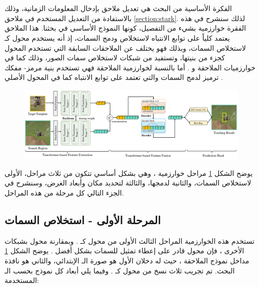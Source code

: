 \section{\label{section:swintrack}}
الفكرة الأساسية من البحث هي تعديل ملاحق
بإدخال المعلومات الزمانية، وذلك بالاستفادة من التعديل المستخدم في ملاحق 
\ref{section:stark}. 
لذلك سنشرح في هذه الفقرة خوارزمية 
بشيء من التفصيل، كونها النموذج الأساسي في بحثنا.
\newline
هذا الملاحق يعتمد كلياً على توابع الانتباه لاستخلاص ودمج السمات، إذ أنه يستخدم محول
كـ
لاستخلاص السمات، وبذلك فهو يختلف عن الملاحقات السابقة التي تستخدم المحول كجزء من بنيتها، وتستفيد من شبكات
لاستخلاص سمات الصور، وذلك كما في خوارزميات الملاحقة
و
.
أما بالنسبة لخوارزمية الملاحقة 
فهي تستخدم بنية  مرمز- مفكك ترميز
لدمج السمات والتي تعتمد على توابع الانتباه كما في المحول الأصلي
. 

\begin{figure}[!h]
	\centerline{\includegraphics[width=\textwidth]{images/swinTrack}}
	\caption{
		}
	\label{fig:swintrack}	
\end{figure}
يوضح الشكل 
\ref{fig:swintrack}
مراحل خوارزمية 
،
وهي بشكل أساسي تتكون من ثلاث مراحل، الأولى لاستخلاص السمات، والثانية لدمجها، والثالثة لتحديد مكان وأبعاد الغرض، وسنشرح في الجزء التالي كل مرحلة من هذه المراحل.
\subsection{المرحلة الأولى - استخلاص السمات}
تستخدم هذه الخوارزمية  المراحل الثالث الأولى من محول
كـ
.
وبمقارنة محول
بشبكات
الأخرى
،
 فإن محول
قادر على إعطاء تمثيل للسمات بشكل أفضل
.
يوضح الشكل 
\ref{fig:swintrack}
مداخل نموذج الملاحقة 
،
حيث له دخلان الأول هو صورة الـ 
الإبتدائي،
والثاني هو نافذة البحث.
\newline
تم تجريب ثلاث نسخ من محول 
كـ
.
وفيما يلي أبعاد كل نموذج بحسب الـ
المستخدمة:

